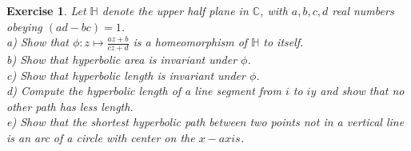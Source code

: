 \documentclass{article}
\newcommand{\bb}[1]{\mathbb{#1}}
\newtheorem{exercise}{Exercise}
\begin{document}
   \begin{exercise} Let $\bb{H}$ denote the upper half plane in $\bb{C}$, with $a,b,c,d$ real numbers obeying $(ad-bc)=1$. \\
     a) Show that $\phi:z \mapsto \frac{az + b}{cz + d}$ is a homeomorphism of $\bb{H}$ to itself. \\
     b) Show that hyperbolic area is invariant under $\phi$. \\
     c) Show that hyperbolic length is invariant under $\phi$.  \\
     d) Compute the hyperbolic length of a line segment from $i$ to $iy$ and show that no other path has less length. \\
     e) Show that the shortest hyperbolic path between two points not in a vertical line is an arc of a circle with center on the $x-axis$. 
   \end{exercise}
\end{document}
